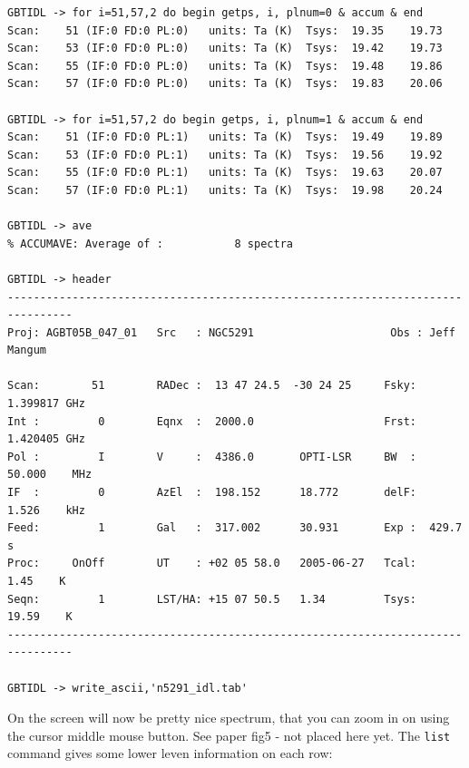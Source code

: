 \documentclass[12pt,a4paper]{article}
\begin{document}
\begin{lstlisting}
GBTIDL -> for i=51,57,2 do begin getps, i, plnum=0 & accum & end  
Scan:    51 (IF:0 FD:0 PL:0)   units: Ta (K)  Tsys:  19.35    19.73
Scan:    53 (IF:0 FD:0 PL:0)   units: Ta (K)  Tsys:  19.42    19.73
Scan:    55 (IF:0 FD:0 PL:0)   units: Ta (K)  Tsys:  19.48    19.86
Scan:    57 (IF:0 FD:0 PL:0)   units: Ta (K)  Tsys:  19.83    20.06

GBTIDL -> for i=51,57,2 do begin getps, i, plnum=1 & accum & end  
Scan:    51 (IF:0 FD:0 PL:1)   units: Ta (K)  Tsys:  19.49    19.89
Scan:    53 (IF:0 FD:0 PL:1)   units: Ta (K)  Tsys:  19.56    19.92
Scan:    55 (IF:0 FD:0 PL:1)   units: Ta (K)  Tsys:  19.63    20.07
Scan:    57 (IF:0 FD:0 PL:1)   units: Ta (K)  Tsys:  19.98    20.24

GBTIDL -> ave
% ACCUMAVE: Average of :           8 spectra

GBTIDL -> header
--------------------------------------------------------------------------------
Proj: AGBT05B_047_01   Src   : NGC5291                     Obs : Jeff Mangum    

Scan:        51        RADec :  13 47 24.5  -30 24 25     Fsky:   1.399817 GHz
Int :         0        Eqnx  :  2000.0                    Frst:   1.420405 GHz
Pol :         I        V     :  4386.0       OPTI-LSR     BW  :  50.000    MHz
IF  :         0        AzEl  :  198.152      18.772       delF:   1.526    kHz
Feed:         1        Gal   :  317.002      30.931       Exp :  429.7     s
Proc:     OnOff        UT    : +02 05 58.0   2005-06-27   Tcal:    1.45    K
Seqn:         1        LST/HA: +15 07 50.5   1.34         Tsys:   19.59    K
--------------------------------------------------------------------------------

GBTIDL -> write_ascii,'n5291_idl.tab'
\end{lstlisting}

On the screen will now be pretty nice spectrum, that you can zoom in on using
the cursor middle mouse button. See paper fig5 - not placed here yet.
The {\tt list} command gives some lower leven information on each row:
\end{document}
